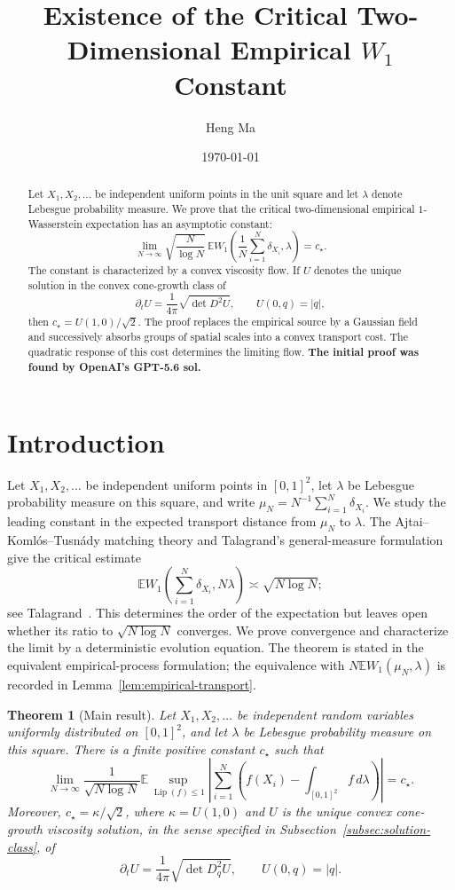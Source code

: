 \documentclass{aomart}
\title{Existence of the Critical Two-Dimensional Empirical \(W_1\) Constant}
\author{Heng Ma}
\date{\today}
\newtheorem{theorem}{Theorem}[section]
\theoremstyle{definition}
\newcommand{\1}{\mathbf 1}
\newcommand{\Lip}{\operatorname{Lip}}
\begin{document}
\begin{abstract}
Let \(X_1,X_2,\ldots\) be independent uniform points in the unit square and let
\(\lambda\) denote Lebesgue probability measure.  We prove that the critical
two-dimensional empirical \(1\)-Wasserstein expectation has an asymptotic
constant:
\[
  \lim_{N\to\infty}
  \sqrt{\frac{N}{\log N}}\,
  \mathbb E W_1\!\left(\frac1N\sum_{i=1}^N\delta_{X_i},\lambda\right)
  =c_\star.
\]
The constant is characterized by a convex viscosity flow.  If \(U\) denotes the
unique solution in the convex cone-growth class of
\[
  \partial_tU=\frac1{4\pi}\sqrt{\det D^2U},
  \qquad U(0,q)=|q|,
\]
then \(c_\star=U(1,0)/\sqrt2\).  The proof replaces the empirical source
by a Gaussian field and successively absorbs groups of spatial scales
into a convex transport cost.  The quadratic response of this cost
determines the limiting flow. \textbf{The initial proof  was found by OpenAI's GPT-5.6 sol.}
\end{abstract}

\maketitle

\tableofcontents

\section{Introduction}\label{sec:introduction}

Let $X_1,X_2,\ldots$ be independent uniform points in $[0,1]^2$, let
$\lambda$ be Lebesgue probability measure on this square, and write
$\mu_N=N^{-1}\sum_{i=1}^N\delta_{X_i}$.  We study the leading constant
in the expected transport distance from $\mu_N$ to $\lambda$.
The Ajtai--Koml\'os--Tusn\'ady matching theory and Talagrand's
general-measure formulation give the critical estimate
\[
  \mathbb E W_1\!\left(\sum_{i=1}^N\delta_{X_i},N\lambda\right)
  \asymp \sqrt{N\log N};
\]
see Talagrand~\cite{Talagrand1992}.  This determines the order of the
expectation but leaves open whether its ratio to $\sqrt{N\log N}$
converges.  We prove convergence and characterize the limit by a
deterministic evolution equation.  The theorem is stated in the equivalent
empirical-process formulation; the equivalence with $N\mathbb E
W_1(\mu_N,\lambda)$ is recorded in Lemma~\ref{lem:empirical-transport}.

\begin{theorem}[Main result]\label{thm:intro-main}
Let \(X_1,X_2,\ldots\) be independent random variables uniformly distributed
on \([0,1]^2\), and let \(\lambda\) be Lebesgue probability measure on this
square.  There is a finite positive constant \(c_\star\) such that
\[
\lim_{N\to\infty}\frac1{\sqrt{N\log N}}
\mathbb E\sup_{\Lip(f)\leq1}
\left|\sum_{i=1}^N\left(f(X_i)-\int_{[0,1]^2}f\,d\lambda\right)\right|
=c_\star.
\]
Moreover, \(c_\star=\kappa/\sqrt2\), where \(\kappa=U(1,0)\) and \(U\) is
the unique convex cone-growth viscosity solution, in the sense specified
in Subsection~\ref{subsec:solution-class}, of
\[
\partial_tU=\frac1{4\pi}\sqrt{\det D_q^2U},
\qquad U(0,q)=|q|.
\]
\end{theorem}
\end{document}
